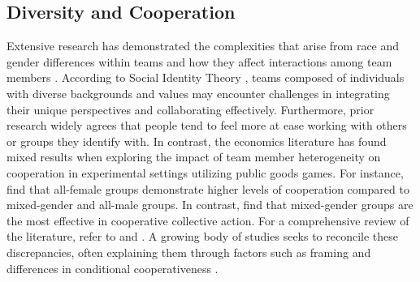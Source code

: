 \subsection{Diversity and Cooperation }
\hspace *{0mm} Extensive research has demonstrated the complexities that arise from race and gender differences within teams and how they affect interactions among team members \citep{ha12}. According to Social Identity Theory \citep{t78,tbt79}, teams composed of individuals with diverse backgrounds and values may encounter challenges in integrating their unique perspectives and collaborating effectively. Furthermore, prior research widely agrees that people tend to feel more at ease working with others or groups they identify with. In contrast, the economics literature has found mixed results when exploring the impact of team member heterogeneity on cooperation in experimental settings utilizing public goods games. For instance, \cite{nt94} find that all-female groups demonstrate higher levels of cooperation compared to mixed-gender and all-male groups. In contrast, \cite{pbm19} find that mixed-gender groups are the most effective in cooperative collective action. For a comprehensive review of the literature, refer to \cite{blmv11} and \cite{cg09}. A growing body of studies seeks to reconcile these discrepancies, often explaining them through factors such as framing \citep{blmv11, ejmm13} and differences in conditional cooperativeness \citep{fkmmw21}.

